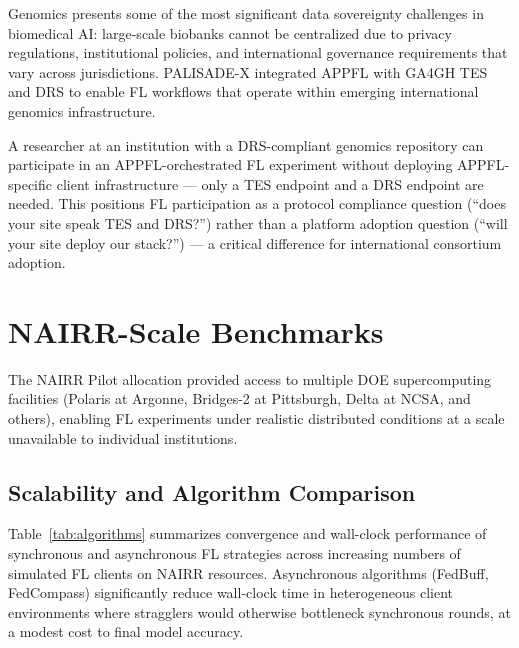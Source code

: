 \documentclass[conference]{IEEEtran}
\begin{document}
Genomics presents some of the most significant data sovereignty challenges in biomedical AI: large-scale biobanks cannot be centralized due to privacy regulations, institutional policies, and international governance requirements that vary across jurisdictions. PALISADE-X integrated APPFL with GA4GH TES and DRS to enable FL workflows that operate within emerging international genomics infrastructure.

A researcher at an institution with a DRS-compliant genomics repository can participate in an APPFL-orchestrated FL experiment without deploying APPFL-specific client infrastructure — only a TES endpoint and a DRS endpoint are needed. This positions FL participation as a protocol compliance question (``does your site speak TES and DRS?'') rather than a platform adoption question (``will your site deploy our stack?'') — a critical difference for international consortium adoption.

\section{NAIRR-Scale Benchmarks}

The NAIRR Pilot allocation provided access to multiple DOE supercomputing facilities (Polaris at Argonne, Bridges-2 at Pittsburgh, Delta at NCSA, and others), enabling FL experiments under realistic distributed conditions at a scale unavailable to individual institutions.

\subsection{Scalability and Algorithm Comparison}

Table~\ref{tab:algorithms} summarizes convergence and wall-clock performance of synchronous and asynchronous FL strategies across increasing numbers of simulated FL clients on NAIRR resources. Asynchronous algorithms (FedBuff, FedCompass) significantly reduce wall-clock time in heterogeneous client environments where stragglers would otherwise bottleneck synchronous rounds, at a modest cost to final model accuracy.
\end{document}
